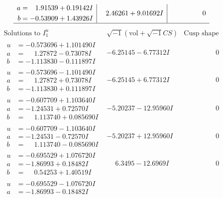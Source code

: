 \documentclass[1p]{elsarticle_modified}
\theoremstyle{definition}
\newcommand{\I}{\sqrt{-1}}
\begin{document}
$$\begin{array}{c|c|c}
\begin{aligned}
a &= \phantom{-}1.91539 + 0.19142 I \\
b &= -0.53909 + 1.43926 I\end{aligned}
 & \phantom{-}2.46261 + 9.01692 I & \phantom{-0.000000 } 0\\
 \hline 
 \end{array}$$\newpage$$\begin{array}{c|c|c}  
\text{Solutions to }I^u_{1}& \I (\text{vol} + \sqrt{-1}CS) & \text{Cusp shape}\\
 \hline 
\begin{aligned}
u &= -0.573696 + 1.101490 I \\
a &= \phantom{-}1.27872 - 0.73078 I \\
b &= -1.113830 - 0.111897 I\end{aligned}
 & -6.25145 - 6.77312 I & \phantom{-0.000000 } 0 \\ \hline\begin{aligned}
u &= -0.573696 - 1.101490 I \\
a &= \phantom{-}1.27872 + 0.73078 I \\
b &= -1.113830 + 0.111897 I\end{aligned}
 & -6.25145 + 6.77312 I & \phantom{-0.000000 } 0 \\ \hline\begin{aligned}
u &= -0.607709 + 1.103640 I \\
a &= -1.24531 + 0.72570 I \\
b &= \phantom{-}1.113740 + 0.085690 I\end{aligned}
 & -5.20237 - 12.95960 I & \phantom{-0.000000 } 0 \\ \hline\begin{aligned}
u &= -0.607709 - 1.103640 I \\
a &= -1.24531 - 0.72570 I \\
b &= \phantom{-}1.113740 - 0.085690 I\end{aligned}
 & -5.20237 + 12.95960 I & \phantom{-0.000000 } 0 \\ \hline\begin{aligned}
u &= -0.695529 + 1.076720 I \\
a &= -1.86993 + 0.18482 I \\
b &= \phantom{-}0.54253 + 1.40519 I\end{aligned}
 & \phantom{-}6.3495 - 12.6969 I & \phantom{-0.000000 } 0 \\ \hline\begin{aligned}
u &= -0.695529 - 1.076720 I \\
a &= -1.86993 - 0.18482 I \\

\end{aligned}
\end{array}$$
\end{document}

